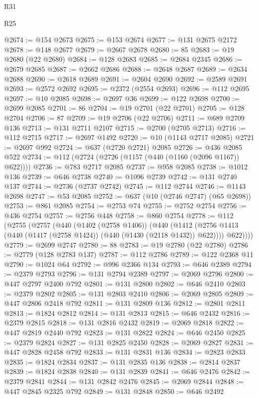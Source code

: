 \begin{lexlean}{R31}
\begin{lexlean}{R25}
\begin{coremodule}
{{{{{{{{{{{{{{{{{{{{{{{{{{{{{{{{{{{{{{{{{{{{{{{{{{{{{{{{{{{{{{{{{{{{{{{{{{{{{{{{{{{{{{{{{{{{{{{{{{{{{{{{{{{{{{{{{{{{{{{{{{{{{{{{{{{{{{{{{{{{{{{{{{{{{{{{{{{{{{{{{{{{{{{{{{{{{{{{{{{{{{{{{{{{{{{{{{{{{{{@2674 := @154 @2673
@2675 := @153 @2674
@2677 := @131 @2675 @2172
@2678 := @148 @2677
@2679 := @2667 @2678
@2680 := 85
@2683 := @19 @2680 (@22 @2680)
@2684 := @128 @2683
@2685 := @2684 @2345
@2686 := @2679 @2685
@2687 := @2662 @2686
@2688 := @2648 @2687
@2689 := @2634 @2688
@2690 := @2618 @2689
@2691 := @2604 @2690
@2692 := @2589 @2691
@2693 := @2572 @2692
@2695 := @2372 (@2554 @2693)
@2696 := @112 @2695
@2697 := @10 @2085
@2698 := @2697 @36
@2699 := @122 @2698
@2700 := @2699 @2085
@2701 := 86
@2704 := @19 @2701 (@22 @2701)
@2705 := @128 @2704
@2706 := 87
@2709 := @19 @2706 (@22 @2706)
@2711 := @689 @2709 @136
@2713 := @131 @2711 @2107
@2715 := @2700 (@2705 @2713)
@2716 := @112 @2715
@2717 := @2697 @1492
@2720 := @10 (@1143 @2717 @2085)
@2721 := @2697 @992
@2724 := @637 (@2720 @2721) @2085
@2726 := @436 @2085 @522
@2734 := @112 (@2724 (@2726 (@1157 (@440 (@1160 (@2096 @1167)) @622))))
@2736 := @783 @2717 @2085
@2737 := @958 @2085
@2738 := @1012 @136
@2739 := @646 @2738
@2740 := @1096 @2739
@2742 := @131 @2740 @137
@2744 := @2736 (@2737 @2742)
@2745 := @112 @2744
@2746 := @1143 @2698
@2747 := @53 @2085
@2752 := @637 (@10 (@2746 @2747) (@65 @2698))
@2753 := @861 @2085
@2754 := @2753 @74
@2755 := @2752 @2754
@2756 := @436 @2754
@2757 := @2756 @448
@2758 := @860 @2754
@2778 := @112
    (@2755
      (@2757
        (@440
          (@1402 (@2758 @1406))
          (@440
            (@1412 (@2756 @1413 (@440 (@1417 (@2758 @1424)) (@440 (@1430 (@2118 @1432)) @622))))
            @622))))
@2779 := @2699 @2747
@2780 := 88
@2783 := @19 @2780 (@22 @2780)
@2786 := @2779 (@128 @2783 @137)
@2787 := @112 @2786
@2789 := @122 @2368 @11
@2790 := @1024 @64
@2792 := @996 @2366 @134
@2793 := @646 @2389
@2794 := @2379 @2793
@2796 := @131 @2794 @2389
@2797 := @2069 @2796
@2800 := @447 @2797 @2400 @792
@2801 := @131 @2800
@2802 := @646 @2410
@2803 := @2379 @2802
@2805 := @131 @2803 @2410
@2806 := @2069 @2805
@2809 := @447 @2806 @2418 @792
@2811 := @131 @2809 @136
@2812 := @2801 @2811
@2813 := @1824 @2812
@2814 := @131 @2813
@2815 := @646 @2432
@2816 := @2379 @2815
@2818 := @131 @2816 @2432
@2819 := @2069 @2818
@2822 := @447 @2819 @2440 @792
@2823 := @131 @2822
@2824 := @646 @2450
@2825 := @2379 @2824
@2827 := @131 @2825 @2450
@2828 := @2069 @2827
@2831 := @447 @2828 @2458 @792
@2833 := @131 @2831 @136
@2834 := @2823 @2833
@2835 := @1824 @2834
@2837 := @131 @2835 @136
@2838 := @2814 @2837
@2839 := @1824 @2838
@2840 := @131 @2839
@2841 := @646 @2476
@2842 := @2379 @2841
@2844 := @131 @2842 @2476
@2845 := @2069 @2844
@2848 := @447 @2845 @2325 @792
@2849 := @131 @2848
@2850 := @646 @2492
}}}}}}}}}}}}}}}}}}}}}}}}}}}}}}}}}}}}}}}}}}}}}}}}}}}}}}}}}}}}}}}}}}}}}}}}}}}}}}}}}}}}}}}}}}}}}}}}}}}}}}}}}}}}}}}}}}}}}}}}}}}}}}}}}}}}}}}}}}}}}}}}}}}}}}}}}}}}}}}}}}}}}}}}}}}}}}}}}}}}}}}}}}}}}}}}}}}}}}}
\end{coremodule}
\end{lexlean}
\end{lexlean}
